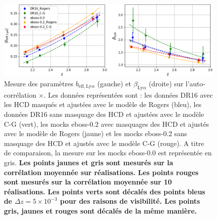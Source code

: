 \documentclass[11pt, twoside, a4paper, openright]{report}
\begin{document}
\begin{figure}
  \centering
  \includegraphics[scale=0.45]{bias_CG_no_mask}
  \caption{Mesure des paramètres $b_{\mathrm{eff},\mathrm{Ly}\alpha}$ (gauche) et  $\beta_{\mathrm{Ly}\alpha}$ (droite) sur l'auto-corrélation \lya$\times$\lya{}.
    Les données représentées sont : les données DR16 avec les HCD masqués et ajustées avec le modèle de Rogers (bleu), les données DR16 sans masquage des HCD et ajustées avec le modèle C-G (vert), les mocks eboss-0.2 avec masquages des HCD et ajustés avec le modèle de Rogers (jaune) et les mocks eboss-0.2 sans masquage des HCD et ajustés avec le modèle C-G (rouge). A titre de comparaison, la mesure sur les mocks eboss-0.0 est représentée en gris.
    \textbf{Les points jaunes et gris sont mesurés sur la corrélation moyennée sur \Nmocks{} réalisations. Les points rouges sont mesurés sur la corrélation moyennée sur \num{10} réalisations.
    Les points verts sont décalés des points bleus de $\Delta z = 5\times10^{-3}$ pour des raisons de visibilité. Les points gris, jaunes et rouges sont décalés de la même manière.}
  }
  \label{fig:bias_CG_no_mask}
\end{figure}
\end{document}

